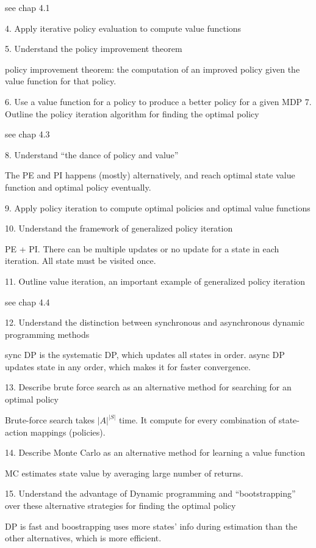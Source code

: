 \documentclass[lang=en,mode=geye,device=normal,color=blue,14pt]{elegantnote}
\DeclareMathOperator*{\1}{\mathbbm{1}}
\begin{document}
see chap 4.1

4. Apply iterative policy evaluation to compute value functions

5. Understand the policy improvement theorem

policy improvement theorem: the computation of an improved policy given the value function for that policy.

6. Use a value function for a policy to produce a better policy for a given MDP
7. Outline the policy iteration algorithm for finding the optimal policy

see chap 4.3

8. Understand “the dance of policy and value”

The PE and PI happens (mostly) alternatively, and reach optimal state value function and optimal policy eventually.

9. Apply policy iteration to compute optimal policies and optimal value functions

10. Understand the framework of generalized policy iteration

PE + PI. There can be multiple updates or no update for a state in each iteration. All state must be visited once.

11. Outline value iteration, an important example of generalized policy iteration

see chap 4.4

12. Understand the distinction between synchronous and asynchronous dynamic programming methods

sync DP is the systematic DP, which updates all states in order. async DP updates state in any order, which makes it for faster convergence.

13. Describe brute force search as an alternative method for searching for an optimal policy

Brute-force search takes $|A|^{|S|}$ time. It compute for every combination of state-action mappings (policies).

14. Describe Monte Carlo as an alternative method for learning a value function

MC estimates state value by averaging large number of returns.

15. Understand the advantage of Dynamic programming and “bootstrapping” over these alternative strategies for finding the optimal policy

DP is fast and boostrapping uses more states' info during estimation than the other alternatives, which is more efficient.
\end{document}
